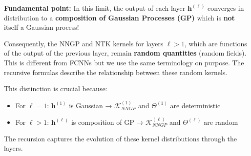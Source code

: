 \documentclass[a4paper]{article}
\theoremstyle{plain}
\theoremstyle{definition}
\theoremstyle{remark}
\begin{document}
\begin{tcolorbox}[colback=red!10,colframe=red!80!black,title={\textbf{Crucial Remark: Composition of Gaussian Processes}},enhanced,drop shadow,boxrule=2pt]
\textbf{Fundamental point:} In this limit, the output of each layer $\bm{h}^{(\ell)}$ converges in distribution to a \textbf{composition of Gaussian Processes (GP)} which is \textbf{not} itself a Gaussian process!

Consequently, the NNGP and NTK kernels for layers $\ell > 1$, which are functions of the output of the previous layer, 
remain \textbf{random quantities} (random fields). This is different from FCNNs but we use the same terminology on purpose.
The recursive formulas describe the relationship between these random kernels.

This distinction is crucial because:
\begin{itemize}
\item For $\ell = 1$: $\bm{h}^{(1)}$ is Gaussian → $\mathcal{K}_{NNGP}^{(1)}$ and $\Theta^{(1)}$ are deterministic
\item For $\ell > 1$: $\bm{h}^{(\ell)}$ is composition of GP → $\mathcal{K}_{NNGP}^{(\ell)}$ and $\Theta^{(\ell)}$ are random
\end{itemize}

The recursion captures the evolution of these kernel distributions through the layers.
\end{tcolorbox}
\end{document}
